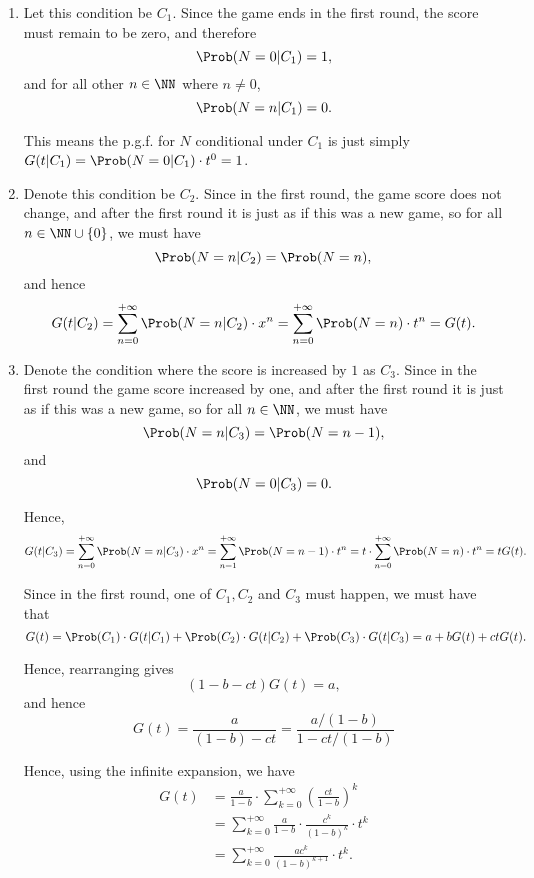 \Question{\currfilebase}
\begin{enumerate}
    \item Let this condition be \(C_1\). Since the game ends in the first round, the score must remain to be zero, and therefore
          \[
              \Prob(N = 0 | C_1) = 1,
          \]
          and for all other \(n \in \NN\) where \(n \neq 0\),
          \[
              \Prob(N = n | C_1) = 0.
          \]

          This means the p.g.f. for \(N\) conditional under \(C_1\) is just simply \(G(t | C_1) = \Prob(N = 0 | C_1) \cdot t^0 = 1\).

    \item Denote this condition be \(C_2\). Since in the first round, the game score does not change, and after the first round it is just as if this was a new game, so for all \(n \in \NN \cup \{0\}\), we must have
          \[
              \Prob(N = n | C_2) = \Prob(N = n),
          \]
          and hence
          \[
              G(t | C_2) = \sum_{n = 0}^{+\infty} \Prob(N = n | C_2) \cdot x^n = \sum_{n = 0}^{+\infty} \Prob(N = n) \cdot t^n = G(t).
          \]

    \item Denote the condition where the score is increased by \(1\) as \(C_3\). Since in the first round the game score increased by one, and after the first round it is just as if this was a new game, so for all \(n \in \NN\), we must have
          \[
              \Prob(N = n | C_3) = \Prob(N = n - 1),
          \]
          and
          \[
              \Prob(N = 0 | C_3) = 0.
          \]

          Hence,
          \[
              G(t | C_3) = \sum_{n = 0}^{+\infty} \Prob(N = n | C_3) \cdot x^n = \sum_{n = 1}^{+\infty} \Prob(N = n - 1) \cdot t^n = t \cdot \sum_{n = 0}^{+\infty} \Prob(N = n) \cdot t^n= tG(t).
          \]

          Since in the first round, one of \(C_1, C_2\) and \(C_3\) must happen, we must have that
          \[
              G(t) = \Prob(C_1) \cdot G(t|C_1) + \Prob(C_2) \cdot G(t|C_2) + \Prob(C_3) \cdot G(t|C_3) = a + b G(t) + ctG(t).
          \]

          Hence, rearranging gives
          \[
              (1 - b - ct) G(t) = a,
          \]
          and hence
          \[
              G(t) = \frac{a}{(1 - b) - ct} = \frac{a / (1 - b)}{1 - ct / (1 - b)}
          \]

          Hence, using the infinite expansion, we have
          \begin{align*}
              G(t) & = \frac{a}{1-b} \cdot \sum_{k = 0}^{+\infty} \left(\frac{ct}{1 - b}\right)^k   \\
                   & = \sum_{k = 0}^{+\infty} \frac{a}{1 - b} \cdot \frac{c^k}{(1 - b)^k} \cdot t^k \\
                   & = \sum_{k = 0}^{+\infty} \frac{ac^k}{(1 - b)^{k + 1}} \cdot t^k.
          \end{align*}


\end{enumerate}
